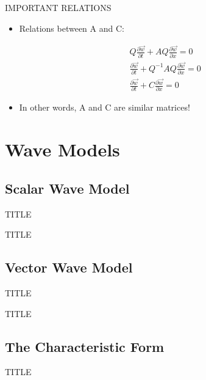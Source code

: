 \documentclass{beamer}
\begin{document}
\begin{frame}{IMPORTANT RELATIONS}
  \begin{itemize}
   \item Relations between A and C:
  \end{itemize}
  \begin{eqnarray}
   &&Q\frac{\partial{\vec{w}}}{\partial{t}}+AQ\frac{\partial{\vec{w}}}{\partial{x}}=0 \\
   &&\frac{\partial{\vec{w}}}{\partial{t}}+Q^{-1}AQ\frac{\partial{\vec{w}}}{\partial{x}}=0 \\
   &&\frac{\partial{\vec{w}}}{\partial{t}}+C\frac{\partial{\vec{w}}}{\partial{x}}=0
  \end{eqnarray}
  \begin{itemize}
   \item In other words, A and C are similar matrices!
  \end{itemize}
\end{frame}

\section{Wave Models}

\subsection{Scalar Wave Model}

\begin{frame}{TITLE}
\end{frame}

\begin{frame}{TITLE}
\end{frame}

\subsection{Vector Wave Model}

\begin{frame}{TITLE}
\end{frame}

\begin{frame}{TITLE}
\end{frame}

\subsection{The Characteristic Form}

\begin{frame}{TITLE}
\end{frame}
\end{document}

